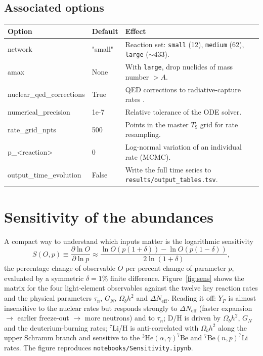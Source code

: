 \documentclass[11pt,a4paper]{article}
\newcommand{\Neff}{N_{\mathrm{eff}}}
\newcommand{\YP}{Y_P}
\newcommand{\code}[1]{\texttt{#1}}
\begin{document}
\subsection{Associated options}
\begin{center}\small
\begin{tabular}{>{\ttfamily}l l >{\raggedright\arraybackslash}p{8.4cm}}
\toprule
\normalfont Option & Default & Effect \\
\midrule
network                 & "small" & Reaction set: \code{small} (12), \code{medium} (62), \code{large} ($\sim$433). \\
amax                    & None    & With \code{large}, drop nuclides of mass number $> A$. \\
nuclear\_qed\_corrections & True  & QED corrections to radiative-capture rates \cite{PitrouPospelov2020}. \\
numerical\_precision    & 1e-7    & Relative tolerance of the ODE solver. \\
rate\_grid\_npts        & 500     & Points in the master $T_9$ grid for rate resampling. \\
p\_<reaction>           & 0       & Log-normal variation of an individual rate (MCMC). \\
output\_time\_evolution & False   & Write the full time series to \code{results/output\_tables.tsv}. \\
\bottomrule
\end{tabular}
\end{center}

\section{Sensitivity of the abundances}\label{sec:sensitivity}
A compact way to understand which inputs matter is the logarithmic sensitivity
\begin{equation}
  S(O,p) \equiv \frac{\partial\ln O}{\partial\ln p}
  \approx \frac{\ln O(p(1+\delta)) - \ln O(p(1-\delta))}{2\ln(1+\delta)},
\end{equation}
the percentage change of observable $O$ per percent change of parameter $p$,
evaluated by a symmetric $\delta=1\%$ finite difference. Figure~\ref{fig:sens}
shows the matrix for the four light-element observables against the twelve key
reaction rates and the physical parameters $\tau_n$, $G_N$, $\Omega_bh^2$ and
$\Delta\Neff$. Reading it off: $\YP$ is almost insensitive to the nuclear rates
but responds strongly to $\Delta\Neff$ (faster expansion $\to$ earlier
freeze-out $\to$ more neutrons) and to $\tau_n$; D/H is driven by $\Omega_bh^2$,
$G_N$ and the deuterium-burning rates; $^7$Li/H is anti-correlated with
$\Omega_bh^2$ along the upper Schramm branch and sensitive to the
$^3$He$(\alpha,\gamma)^7$Be and $^7$Be$(n,p)^7$Li rates. The figure reproduces
\code{notebooks/Sensitivity.ipynb}.
\end{document}
